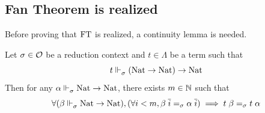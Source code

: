\documentclass[a4paper,UKenglish,cleveref, autoref, thm-restate]{lipics-v2021}
\begin{document}
\subsection{Fan Theorem is realized}

Before proving that $\mathrm{FT}$ is realized, a continuity lemma is needed.

\begin{lemma}[Continuity]\label{lem:continuity}
  Let $\sigma\in\mathcal O$ be a reduction context and $t \in \Lambda$ be a term such that
  \[t \Vdash_{\sigma}^{} (\mathrm{Nat} \to \mathrm{Nat}) \to \mathrm{Nat}\]
  Then for any $\alpha \Vdash_{\sigma}^{} \mathrm{Nat} \to \mathrm{Nat}$, there exists $m\in \mathbb N$ such that
  \[\forall (\beta \Vdash_{\sigma}^{} \mathrm{Nat} \to \mathrm{Nat}), (\forall i < m, \beta\;\overline i =_{\sigma} \alpha\;\overline i) \implies t\;\beta =_{\sigma} t\;\alpha\]
\end{lemma}
\end{document}
